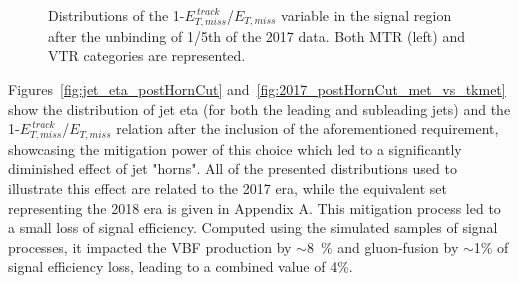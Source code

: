 \begin{figure}[htbp]
  \centering
  \caption{Distributions of the 1-$E_{T,miss}^{~track}$/$E_{T, miss}$ variable in the signal region after the unbinding of 1/5th of the 2017 data. Both MTR (left) and VTR categories are represented.}
  \label{fig:met_vs_tkmet_2017}
\end{figure}

\hspace{10pt} Figures~\ref{fig:jet_eta_postHornCut} and~\ref{fig:2017_postHornCut_met_vs_tkmet} show the distribution of jet eta (for both the leading and subleading jets) and the 1-$E_{T,miss}^{~track}$/$E_{T, miss}$ relation after the inclusion of the aforementioned requirement, showcasing the mitigation power of this choice which led to a significantly diminished effect of jet "horns". All of the presented distributions used to illustrate this effect are related to the 2017 era, while the equivalent set representing the 2018 era is given in Appendix A. This mitigation process led to a small loss of signal efficiency. Computed using the simulated samples of signal processes, it impacted the VBF production by $\sim$8~\% and gluon-fusion by $\sim$1\% of signal efficiency loss, leading to a combined value of 4\%.

